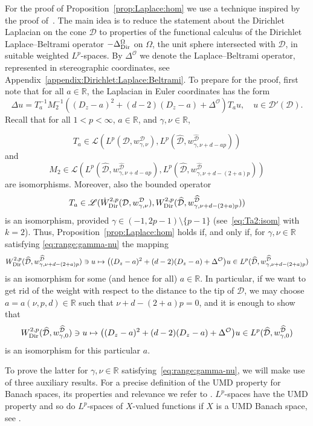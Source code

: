 \documentclass[12pt,a4paper, reqno]{amsart}
\theoremstyle{plain}
\theoremstyle{definition}
\theoremstyle{remark}
\numberwithin{equation}{section}
\newcommand{\1}{\mathbbm{1}}
\newcommand{\R}{\ensuremath{\mathbb{R}}}
\newcommand{\calO}{\ensuremath{\mathcal{O}}}
\newcommand{\calD}{\ensuremath{\mathcal{D}}}
\newcommand{\scrD}{\ensuremath{\mathscr{D}}}
\newcommand{\scrL}{\ensuremath{\mathscr{L}}}
\newcommand{\Dir}{\textup{Dir}}
\begin{document}
For the proof of Proposition~\ref{prop:Laplace:hom} we use a technique inspired by the proof of~\cite[Corollary~5.2]{Prss2007HinftycalculusFT}.
The main idea is to reduce the statement about the Dirichlet Laplacian on the cone $\calD$ to properties of the functional calculus of the Dirichlet Laplace--Beltrami operator $-\Delta_\Dir^{\Omega}$ on $\Omega$, the unit sphere intersected with $\calD$, in suitable weighted $L^p$-spaces. By $\Delta^\calO$ we denote the Laplace--Beltrami operator, represented in stereographic coordinates, see Appendix~\ref{appendix:Dirichlet:Laplace:Beltrami}.  
To prepare for the proof, first note that for all $a\in\R$, the Laplacian in Euler coordinates has the form
\[
\Delta u = T_a^{-1}M_2^{-1}((D_z-a)^2+(d-2)(D_z-a)+\Delta^{\calO})T_a u,\quad u\in\scrD'(\calD).
\]
Recall that for all $1<p<\infty$, $a\in\R$, and $\gamma,\nu\in\R$, 

\[T_a\in\scrL(L^p(\calD,w_{\gamma,\nu}^\calD),L^p(\widehat{\calD},w_{\gamma,\nu+d-ap}^{\widehat{\calD}}))\]
and 
\[M_2\in\scrL(L^p(\widehat{\calD},w_{\gamma,\nu+d-ap}^{\widehat{\calD}}) ,L^p(\widehat{\calD},w_{\gamma,\nu+d-(2+a)p}^{\widehat{\calD}}))\]
are isomorphisms.
Moreover, also the bounded operator 
\[T_a\in\scrL(\Dot{W}^{2,p}_\Dir(\calD,w_{\gamma,\nu}^\calD),
W^{2,p}_\Dir(\widehat{\calD},w_{\gamma,\nu+d-(2+a)p}^{\widehat{\calD}}))\]
is an isomorphism,  provided $\gamma\in(-1,2p-1)\setminus \{p-1\}$ (see~\eqref{eq:Ta2:isom} with $k=2$). 
Thus, Proposition~\ref{prop:Laplace:hom} holds if, and only if, for $\gamma,\nu\in\R$ satisfying \eqref{eq:range:gamma-nu} the mapping
\[
W^{2,p}_\Dir(\widehat{\calD},w_{\gamma,\nu+d-(2+a)p}^{\widehat{\calD}})\ni u\mapsto \big((D_z-a)^2+(d-2)(D_z-a)+\Delta^\calO \big) u\in L^p(\widehat{\calD},w_{\gamma,\nu+d-(2+a)p}^{\widehat{\calD}})
\]
is an isomorphism for some (and hence for all) $a\in\R$.
In particular, if we want to get rid of the weight with respect to the distance to the tip of $\calD$, we may choose 
$a=a(\nu,p,d)\in\R$ such that $\nu+d-(2+a)p=0$, and it is enough to show that 
\begin{equation}\label{eq:B+A:isom}
W^{2,p}_\Dir(\widehat{\calD},w_{\gamma,0}^{\widehat{\calD}})\ni u\mapsto \big((D_z-a)^2+(d-2)(D_z-a)+\Delta^\calO\big) u\in L^p(\widehat{\calD},w_{\gamma,0}^{\widehat{\calD}})
\end{equation}
is an isomorphism for this particular $a$.

To prove the latter for $\gamma,\nu\in\R$ satisfying~\eqref{eq:range:gamma-nu}, we will make use of three auxiliary results. 
For a precise definition of the UMD property for Banach spaces, its properties and relevance we refer to \cite[Chapter 4]{aibs1}. $L^p$-spaces have the UMD property and so do $L^p$-spaces of $X$-valued functions if $X$ is a UMD Banach space, see \cite[Proposition 4.2.15]{aibs1}.
\end{document}
